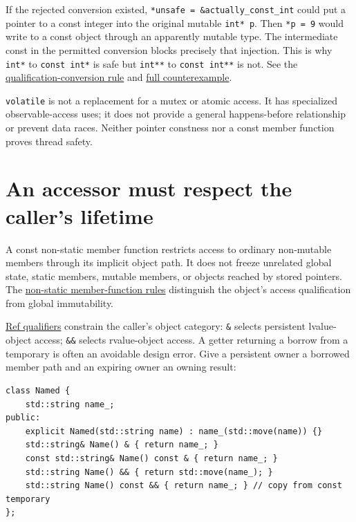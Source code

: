 If the rejected conversion existed, \texttt{*unsafe\ =\ \&actually\_const\_int} could put a pointer to a const integer into the original mutable \texttt{int*\ p}. Then \texttt{*p\ =\ 9} would write to a const object through an apparently mutable type. The intermediate const in the permitted conversion blocks precisely that injection. This is why \texttt{int*} to \texttt{const\ int*} is safe but \texttt{int**} to \texttt{const\ int**} is not. See the \href{https://eel.is/c++draft/conv.qual}{qualification-conversion rule} and \hyperref[01-foundations-i-ch011-c---qualification-safety-and-borrow-intervals]{full counterexample}.

\texttt{volatile} is not a replacement for a mutex or atomic access. It has specialized observable-access uses; it does not provide a general happens-before relationship or prevent data races. Neither pointer constness nor a const member function proves thread safety.

\section{An accessor must respect the caller's lifetime}\label{01-foundations-i-ch003-an-accessor-must-respect-the-callers-lifetime}

A const non-static member function restricts access to ordinary non-mutable members through its implicit object path. It does not freeze unrelated global state, static members, mutable members, or objects reached by stored pointers. The \href{https://eel.is/c++draft/class.mfct.non.static}{non-static member-function rules} distinguish the object's access qualification from global immutability.

\hyperref[appendix-d42039b1d6f7]{Ref qualifiers} constrain the caller's object category: \texttt{\&} selects persistent lvalue-object access; \texttt{\&\&} selects rvalue-object access. A getter returning a borrow from a temporary is often an avoidable design error. Give a persistent owner a borrowed member path and an expiring owner an owning result:

\begin{verbatim}
class Named {
    std::string name_;
public:
    explicit Named(std::string name) : name_(std::move(name)) {}
    std::string& Name() & { return name_; }
    const std::string& Name() const & { return name_; }
    std::string Name() && { return std::move(name_); }
    std::string Name() const && { return name_; } // copy from const temporary
};
\end{verbatim}

